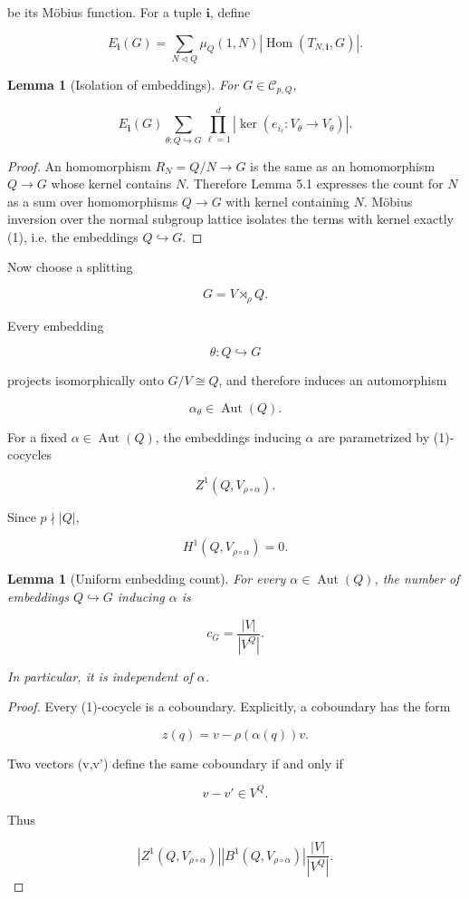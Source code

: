 \documentclass[11pt]{article}
\newtheorem{lemma}[theorem]{Lemma}
\begin{document}
be its Möbius function. For a tuple $\mathbf i$, define

\[
E_{\mathbf i}(G)
=\sum_{N\lhd Q}
\mu_Q(1,N)
|\operatorname{Hom}(T_{N,\mathbf i},G)|.
\]

\begin{lemma}[Isolation of embeddings]
For $G\in\mathcal C_{p,Q}$,

\[
E_{\mathbf i}(G)
\sum_{\theta:Q\hookrightarrow G}
\prod_{\ell=1}^{d}
|\ker(e_{i_\ell}:V_\theta\to V_\theta)|.
\]

\end{lemma}

\begin{proof}
An homomorphism $R_N=Q/N\to G$ is the same as an homomorphism $Q\to G$ whose kernel contains $N$. Therefore Lemma 5.1 expresses the count for $N$ as a sum over homomorphisms $Q\to G$ with kernel containing $N$. Möbius inversion over the normal subgroup lattice isolates the terms with kernel exactly (1), i.e. the embeddings $Q\hookrightarrow G$.

\end{proof}

Now choose a splitting

\[
G=V\rtimes_\rho Q.
\]

Every embedding

\[
\theta:Q\hookrightarrow G
\]

projects isomorphically onto $G/V\cong Q$, and therefore induces an automorphism

\[
\alpha_\theta\in\operatorname{Aut}(Q).
\]

For a fixed $\alpha\in\operatorname{Aut}(Q)$, the embeddings inducing $\alpha$ are parametrized by (1)-cocycles

\[
Z^1(Q,V_{\rho\circ\alpha}).
\]

Since $p\nmid |Q|$,

\[
H^1(Q,V_{\rho\circ\alpha})=0.
\]

\begin{lemma}[Uniform embedding count]
For every $\alpha\in\operatorname{Aut}(Q)$, the number of embeddings $Q\hookrightarrow G$ inducing $\alpha$ is

\[
c_G=\frac{|V|}{|V^Q|}.
\]

In particular, it is independent of $\alpha$.

\end{lemma}

\begin{proof}
Every (1)-cocycle is a coboundary. Explicitly, a coboundary has the form

\[
z
(q)=v-\rho(\alpha(q))v.
\]

Two vectors (v,v') define the same coboundary if and only if

\[
v-v'\in V^Q.
\]

Thus

\[
|Z^1(Q,V_{\rho\circ\alpha})|
|B^1(Q,V_{\rho\circ\alpha})|
\frac{|V|}{|V^Q|}.
\]

\end{proof}
\end{document}
